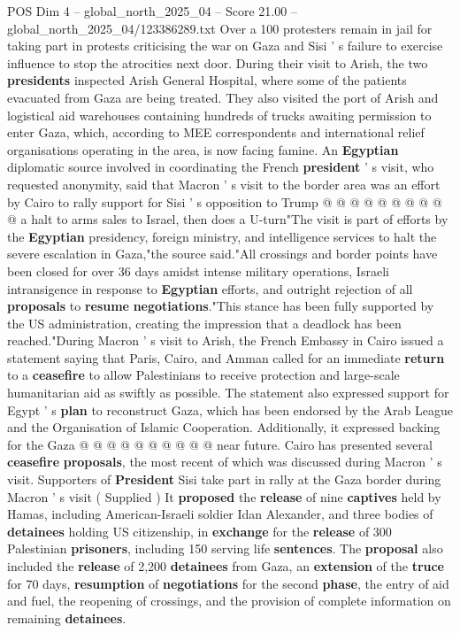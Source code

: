 \begin{textsample}{POS Dim 4 – global\_north\_2025\_04 – Score 21.00 – global\_north\_2025\_04/123386289.txt}
Over a 100 protesters remain in jail for taking part in protests criticising the war on Gaza and Sisi ' s failure to exercise influence to stop the atrocities next door.
During their visit to Arish, the two \textbf{presidents} inspected Arish General Hospital, where some of the patients evacuated from Gaza are being treated.
They also visited the port of Arish and logistical aid warehouses containing hundreds of trucks awaiting permission to enter Gaza, which, according to MEE correspondents and international relief organisations operating in the area, is now facing famine.
An \textbf{Egyptian} diplomatic source involved in coordinating the French \textbf{president} ' s visit, who requested anonymity, said that Macron ' s visit to the border area was an effort by Cairo to rally support for Sisi ' s opposition to Trump @ @ @ @ @ @ @ @ @ @ a halt to arms sales to Israel, then does a U-turn"The visit is part of efforts by the \textbf{Egyptian} presidency, foreign ministry, and intelligence services to halt the severe escalation in Gaza,"the source said."All crossings and border points have been closed for over 36 days amidst intense military operations, Israeli intransigence in response to \textbf{Egyptian} efforts, and outright rejection of all \textbf{proposals} to \textbf{resume} \textbf{negotiations}."This stance has been fully supported by the US administration, creating the impression that a deadlock has been reached."During Macron ' s visit to Arish, the French Embassy in Cairo issued a statement saying that Paris, Cairo, and Amman called for an immediate \textbf{return} to a \textbf{ceasefire} to allow Palestinians to receive protection and large-scale humanitarian aid as swiftly as possible.
The statement also expressed support for Egypt ' s \textbf{plan} to reconstruct Gaza, which has been endorsed by the Arab League and the Organisation of Islamic Cooperation.
Additionally, it expressed backing for the Gaza @ @ @ @ @ @ @ @ @ @ near future.
Cairo has presented several \textbf{ceasefire} \textbf{proposals}, the most recent of which was discussed during Macron ' s visit.
Supporters of \textbf{President} Sisi take part in rally at the Gaza border during Macron ' s visit ( Supplied ) It \textbf{proposed} the \textbf{release} of nine \textbf{captives} held by Hamas, including American-Israeli soldier Idan Alexander, and three bodies of \textbf{detainees} holding US citizenship, in \textbf{exchange} for the \textbf{release} of 300 Palestinian \textbf{prisoners}, including 150 serving life \textbf{sentences}.
The \textbf{proposal} also included the \textbf{release} of 2,200 \textbf{detainees} from Gaza, an \textbf{extension} of the \textbf{truce} for 70 days, \textbf{resumption} of \textbf{negotiations} for the second \textbf{phase}, the entry of aid and fuel, the reopening of crossings, and the provision of complete information on remaining \textbf{detainees}.

\end{textsample}
